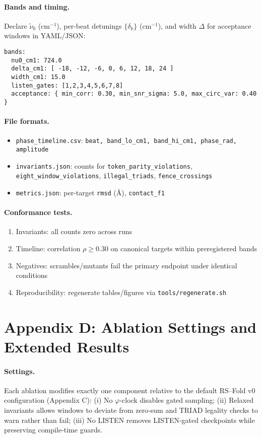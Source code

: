 \documentclass[12pt,a4paper]{article}
\begin{document}
\paragraph{Bands and timing.}
Declare $\tilde\nu_0$ (cm$^{-1}$), per\hyp beat detunings $\{\delta_k\}$ (cm$^{-1}$), and width $\Delta$ for acceptance windows in YAML/JSON:
\begin{verbatim}
bands:
  nu0_cm1: 724.0
  delta_cm1: [ -18, -12, -6, 0, 6, 12, 18, 24 ]
  width_cm1: 15.0
  listen_gates: [1,2,3,4,5,6,7,8]
  acceptance: { min_corr: 0.30, min_snr_sigma: 5.0, max_circ_var: 0.40 }
\end{verbatim}
\paragraph{File formats.}
\begin{itemize}
  \item \texttt{phase\_timeline.csv}: \texttt{beat, band\_lo\_cm1, band\_hi\_cm1, phase\_rad, amplitude}
  \item \texttt{invariants.json}: counts for \texttt{token\_parity\_violations}, \texttt{eight\_window\_violations}, \texttt{illegal\_triads}, \texttt{fence\_crossings}
  \item \texttt{metrics.json}: per\hyp target \texttt{rmsd} (\AA), \texttt{contact\_f1}
\end{itemize}
\paragraph{Conformance tests.}
\begin{enumerate}
  \item Invariants: all counts zero across runs
  \item Timeline: correlation $\rho\ge0.30$ on canonical targets within preregistered bands
  \item Negatives: scrambles/mutants fail the primary endpoint under identical conditions
  \item Reproducibility: regenerate tables/figures via \texttt{tools/regenerate.sh}
\end{enumerate}

\section*{Appendix D: Ablation Settings and Extended Results}
\paragraph{Settings.}
Each ablation modifies exactly one component relative to the default RS–Fold v0 configuration (Appendix C): (i) No $\varphi$‑clock disables gated sampling; (ii) Relaxed invariants allows windows to deviate from zero‑sum and TRIAD legality checks to warn rather than fail; (iii) No LISTEN removes LISTEN‑gated checkpoints while preserving compile‑time guards.
\end{document}
